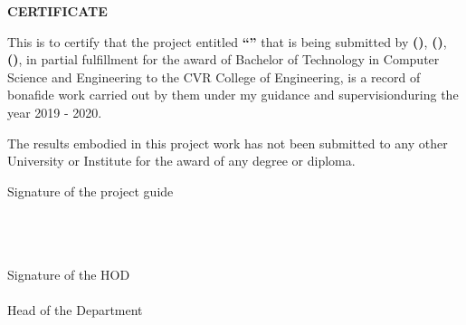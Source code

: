 \begin{center}
    \textbf{CERTIFICATE}
\end{center}

\setlength{\leftskip}{1.2cm}
This is to certify that the project entitled 
\textbf{\MakeUppercase{“\projectTitle”}}
that is being submitted by 
\textbf{\MakeUppercase{\studentAName{} (\MakeUppercase{\rollNoA{}})}},
\textbf{\MakeUppercase{\studentBName{} (\MakeUppercase{\rollNoB{}})}},
\textbf{\MakeUppercase{\studentCName{} (\MakeUppercase{\rollNoC{}})}},
in partial fulfillment for the award of Bachelor of Technology in Computer Science and  
Engineering to the CVR College of Engineering, is a record of bonafide work carried out 
by them under my guidance and supervisionduring the year 2019 - 2020.

\vspace{\baselineskip}

\setlength{\leftskip}{1.2cm}
The results embodied in this project work has not been submitted to any other University 
or Institute for the award of any degree or diploma.

\vspace{\baselineskip}\vspace{\baselineskip}

\setlength{\leftskip}{0pt}
\begin{minipage}[t]{.5\textwidth}
    \raggedright
    Signature of the project guide \\
    \textbf{\MakeUppercase{\guideName{}}} \\
    \guideDesignation \\
    \department{} \\
    \collegeName{}
\end{minipage}%
\begin{minipage}[t]{.5\textwidth}
    \raggedleft
    Signature of the HOD \\
    \textbf{\MakeUppercase{\hodName}} \\
    Head of the Department \\
    \department{} \\
    \collegeName{}
\end{minipage}